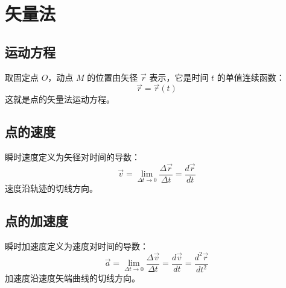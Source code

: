 
\section{矢量法}

\subsection{运动方程}

\begin{center}
\end{center}

取固定点 $O$，动点 $M$ 的位置由矢径 $\vec{r}$ 表示，它是时间 $t$ 的单值连续函数：
\begin{equation}
  \vec{r} = \vec{r}(t)
  \label{eq:6-r-vector}
\end{equation}
这就是点的矢量法运动方程。

\subsection{点的速度}

瞬时速度定义为矢径对时间的导数：
\begin{equation}
  \vec{v} = \lim_{\Delta t \to 0} \frac{\Delta \vec{r}}{\Delta t}
          = \frac{d\vec{r}}{dt}
  \label{eq:6-v-def}
\end{equation}
速度沿轨迹的切线方向。

\subsection{点的加速度}

瞬时加速度定义为速度对时间的导数：
\begin{equation}
  \vec{a} = \lim_{\Delta t \to 0} \frac{\Delta \vec{v}}{\Delta t}
          = \frac{d\vec{v}}{dt}
          = \frac{d^2\vec{r}}{dt^2}
  \label{eq:6-a-def}
\end{equation}
加速度沿速度矢端曲线的切线方向。


